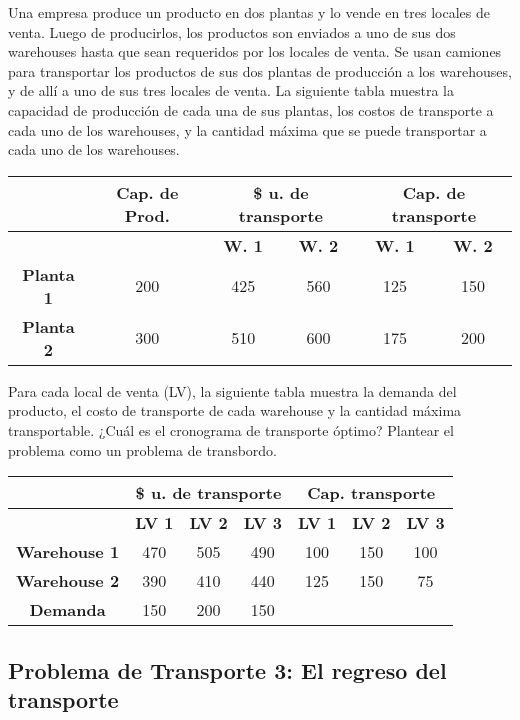 \documentclass[12pt]{article}
\begin{document}
Una empresa produce un producto en dos plantas y lo vende en tres locales de venta. Luego de producirlos, los productos son enviados a uno de sus dos warehouses hasta que sean requeridos por los locales de venta. Se usan camiones para transportar los productos de sus dos plantas de producción a los warehouses, y de allí a uno de sus tres locales de venta. La siguiente tabla muestra la capacidad de producción de cada una de sus plantas, los costos de transporte a cada uno de los warehouses, y la cantidad máxima que se puede transportar a cada uno de los warehouses.

\begin{center}
\begin{tabular}{|c|c|cc|cc|}
\hline
& \textbf{Cap. de Prod.} & \multicolumn{2}{c|}{\textbf{\$ u. de transporte}} & \multicolumn{2}{c}{\textbf{Cap. de transporte}} \\
\hline
& & \textbf{W. 1} & \textbf{W. 2} & \textbf{W. 1} & \textbf{W. 2} \\
\hline
\textbf{Planta 1} & 200 & 425 & 560 & 125 & 150 \\
\textbf{Planta 2} & 300 & 510 & 600 & 175 & 200 \\
\hline
\end{tabular}
\end{center}

Para cada local de venta (LV), la siguiente tabla muestra la demanda del producto, el costo de transporte de cada warehouse y la cantidad máxima transportable. ¿Cuál es el cronograma de transporte óptimo? Plantear el problema como un problema de transbordo.

\begin{center}
\begin{tabular}{|c|ccc|ccc|}
\hline
& \multicolumn{3}{c|}{\textbf{\$ u. de transporte}} & \multicolumn{3}{c|}{\textbf{Cap. transporte}}\\
\hline
& \textbf{LV 1} & \textbf{LV 2} & \textbf{LV 3} & \textbf{LV 1} & \textbf{LV 2} & \textbf{LV 3} \\
\hline
\textbf{Warehouse 1} & 470 & 505 & 490 & 100 & 150 & 100 \\
\textbf{Warehouse 2} & 390 & 410 & 440 & 125 & 150 & 75 \\
\hline
\textbf{Demanda} & 150 & 200 & 150 & & & \\
\hline
\end{tabular}
\end{center}

\subsection{Problema de Transporte 3: El regreso del transporte}
\end{document}
